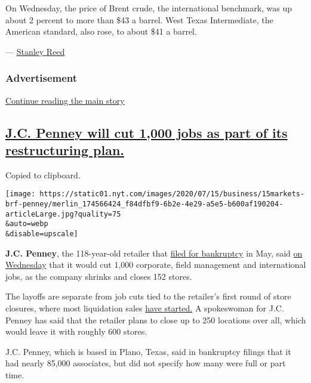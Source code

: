 On Wednesday, the price of Brent crude, the international benchmark, was
up about 2 percent to more than \$43 a barrel. West Texas Intermediate,
the American standard, also rose, to about \$41 a barrel.

--- \href{https://www.nytimes.com/by/stanley-reed}{Stanley Reed}

\hypertarget{advertisement}{%
\subsubsection{Advertisement}\label{advertisement}}

\protect\hyperlink{after-dfp-ad-mid1}{Continue reading the main story}

\hypertarget{jc-penney-will-cut-1000-jobs-as-part-of-its-restructuring-plan}{%
\subsection{\texorpdfstring{\protect\hyperlink{jc-penney-will-cut-1000-jobs-as-part-of-its-restructuring-plan}{J.C.
Penney will cut 1,000 jobs as part of its restructuring
plan.}}{J.C. Penney will cut 1,000 jobs as part of its restructuring plan.}}\label{jc-penney-will-cut-1000-jobs-as-part-of-its-restructuring-plan}}

Copied to clipboard.

\texttt{[image: https://static01.nyt.com/images/2020/07/15/business/15markets-brf-penney/merlin\_174566424\_f84dfbf9-6b2e-4e29-a5e5-b600af190204-articleLarge.jpg?quality=75\\\&auto=webp\\\&disable=upscale]}

\textbf{J.C. Penney}, the 118-year-old retailer that
\href{https://www.nytimes.com/2020/05/15/business/jc-penney-bankruptcy-coronavirus.html}{filed
for bankruptcy} in May, said
\href{https://ir.jcpenney.com/news-events/press-releases/detail/619/jcpenney-announces-organizational-restructuring}{on
Wednesday} that it would cut 1,000 corporate, field management and
international jobs, as the company shrinks and closes 152 stores.

The layoffs are separate from job cuts tied to the retailer's first
round of store closures, where most liquidation sales
\href{https://companyblog.jcpnewsroom.com/storeclosings/}{have started.}
A spokeswoman for J.C. Penney has said that the retailer plans to close
up to 250 locations over all, which would leave it with roughly 600
stores.

J.C. Penney, which is based in Plano, Texas, said in bankruptcy filings
that it had nearly 85,000 associates, but did not specify how many were
full or part time.


